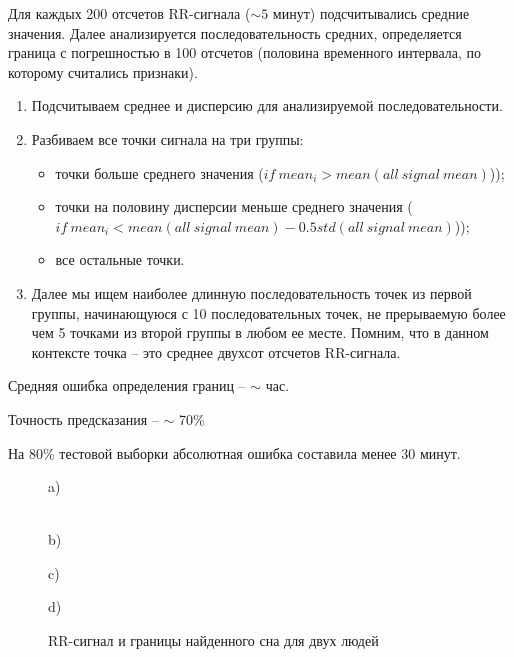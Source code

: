 Для каждых 200 отсчетов RR-сигнала ($\sim 5$ минут) подсчитывались средние значения. Далее анализируется последовательность средних, определяется граница с погрешностью в 100 отсчетов (половина временного интервала, по которому считались признаки).
\begin{enumerate}
	\item Подсчитываем среднее и дисперсию для анализируемой последовательности.
	\item Разбиваем все точки сигнала на три группы:
	\begin{itemize}
		\item точки больше среднего значения ($if\ mean_i > mean(all\ signal\ mean)$));
		\item точки на половину дисперсии меньше среднего значения ($if\ mean_i < mean(all\ signal\ mean) - 0.5std(all\ signal\ mean)$));
		\item все остальные точки.
	\end{itemize}
	\item Далее мы ищем наиболее длинную последовательность точек из первой группы, начинающуюся с 10 последовательных точек, не прерываемую более чем 5 точками из второй группы в любом ее месте. Помним, что в данном контексте точка -- это среднее двухсот отсчетов RR-сигнала.
\end{enumerate}

Средняя ошибка определения границ -- $\sim$ час.

Точность предсказания -- $\sim$ 70\%

На 80\% тестовой выборки абсолютная ошибка составила менее 30 минут.
\begin{figure}[h]
	\begin{minipage}[h]{0.47\linewidth}
		\center{\texttt{[image: 1104770]}} a) \\
	\end{minipage}
	\hfill
	\begin{minipage}[h]{0.47\linewidth}
		\center{\texttt{[image: 1105520]}} \\b)
	\end{minipage}
	\vfill
	\begin{minipage}[h]{0.47\linewidth}
		\center{\texttt{[image: 1104771]}} c) \\
	\end{minipage}
	\hfill
	\begin{minipage}[h]{0.47\linewidth}
		\center{\texttt{[image: 1105521]}} d) \\
	\end{minipage}
	\caption{RR-сигнал и границы найденного сна для двух людей}
	\label{ris:find_sleep_bound1}
\end{figure}
